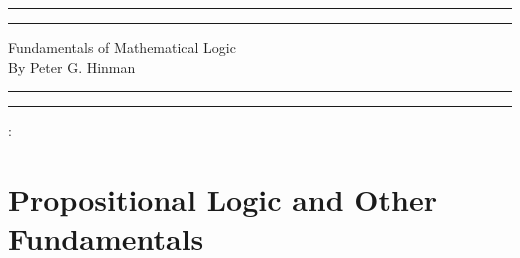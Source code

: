 \documentclass[a4paper, 11pt]{book}
\theoremstyle{plain}
\theoremstyle{plain}
\begin{document}
  \begin{titlepage}
	\centering %
	\scshape %
	\vspace*{1.5\baselineskip} %

	\rule{13cm}{1.6pt}\vspace*{-\baselineskip}\vspace*{2pt} %
	\rule{13cm}{0.4pt} %
	
		\vspace{0.75\baselineskip} %
	{	\Huge Fundamentals of Mathematical Logic \\ 
			\vspace{4mm}
      By Peter G. Hinman \\	}
		\vspace{0.75\baselineskip} %
	\rule{13cm}{0.4pt}\vspace*{-\baselineskip}\vspace{3.2pt} %
	\rule{13cm}{1.6pt} %
	
		\vspace{1.75\baselineskip} %
	{\large : 
		\vspace*{1.2\baselineskip}
	} \\
	\vfill

\end{titlepage}
\begingroup
\let\cleardoublepage\clearpage
\tableofcontents
\endgroup

\chapter{Propositional Logic and Other Fundamentals}
\end{document}
